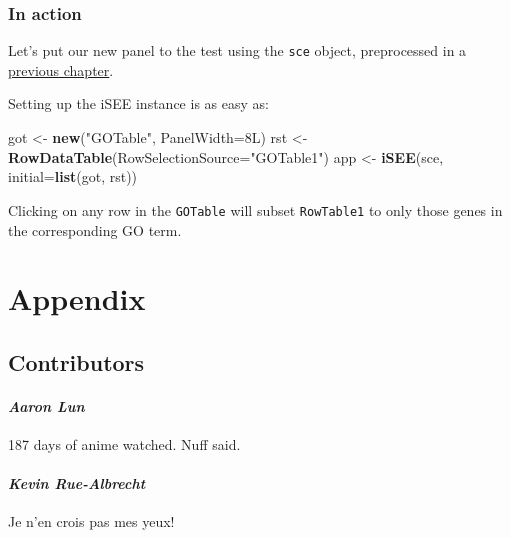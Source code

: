 \documentclass[
]{book}
\newenvironment{Shaded}{\begin{snugshade}}{\end{snugshade}}
\newcommand{\ControlFlowTok}[1]{\textcolor[rgb]{0.13,0.29,0.53}{\textbf{#1}}}
\newcommand{\DataTypeTok}[1]{\textcolor[rgb]{0.13,0.29,0.53}{#1}}
\newcommand{\KeywordTok}[1]{\textcolor[rgb]{0.13,0.29,0.53}{\textbf{#1}}}
\newcommand{\NormalTok}[1]{#1}
\newcommand{\OperatorTok}[1]{\textcolor[rgb]{0.81,0.36,0.00}{\textbf{#1}}}
\newcommand{\StringTok}[1]{\textcolor[rgb]{0.31,0.60,0.02}{#1}}
\begin{document}
\begin{Shaded}
\end{Shaded}

\hypertarget{in-action}{%
\section{In action}\label{in-action}}

Let's put our new panel to the test using the \texttt{sce} object, preprocessed in a \protect\hyperlink{developing}{previous chapter}.

Setting up the iSEE instance is as easy as:

\begin{Shaded}
\begin{Highlighting}[]
\NormalTok{got <-}\StringTok{ }\KeywordTok{new}\NormalTok{(}\StringTok{"GOTable"}\NormalTok{, }\DataTypeTok{PanelWidth=}\NormalTok{8L)}
\NormalTok{rst <-}\StringTok{ }\KeywordTok{RowDataTable}\NormalTok{(}\DataTypeTok{RowSelectionSource=}\StringTok{"GOTable1"}\NormalTok{)}
\NormalTok{app <-}\StringTok{ }\KeywordTok{iSEE}\NormalTok{(sce, }\DataTypeTok{initial=}\KeywordTok{list}\NormalTok{(got, rst))}
\end{Highlighting}
\end{Shaded}

Clicking on any row in the \texttt{GOTable} will subset \texttt{RowTable1} to only those genes in the corresponding GO term.

\hypertarget{part-appendix}{%
\part{Appendix}\label{part-appendix}}

\hypertarget{contributors}{%
\chapter{Contributors}\label{contributors}}

\hypertarget{aaron-lun}{%
\subsection*{\texorpdfstring{\emph{Aaron Lun}}{Aaron Lun}}\label{aaron-lun}}

187 days of anime watched.
Nuff said.

\hypertarget{kevin-rue-albrecht}{%
\subsection*{\texorpdfstring{\emph{Kevin Rue-Albrecht}}{Kevin Rue-Albrecht}}\label{kevin-rue-albrecht}}

Je n'en crois pas mes yeux!

  
\end{document}
